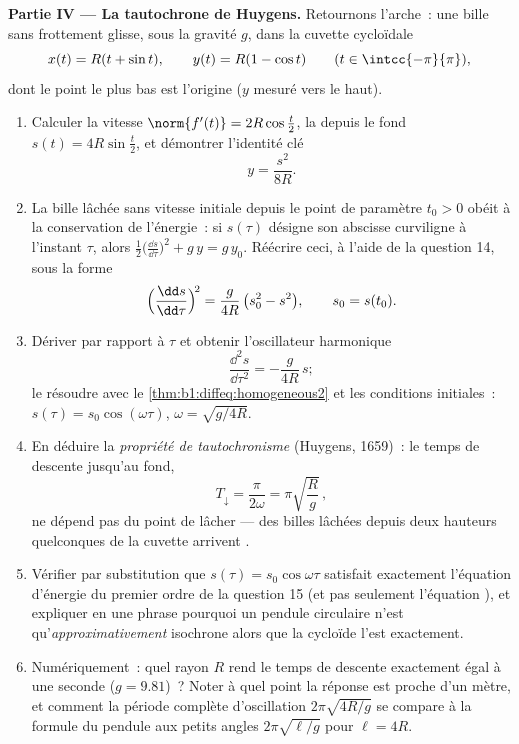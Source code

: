 \begin{problem}
\medskip
\noindent\textbf{Partie IV --- La tautochrone de Huygens.} Retournons
l'arche~: une bille sans frottement glisse, sous la gravité $g$, dans la
cuvette cycloïdale
\[
x(t) = R(t + \sin t), \qquad y(t) = R(1 - \cos t)
\qquad (t \in \intcc{-\pi}{\pi}),
\]
dont le point le plus bas est l'origine ($y$ mesuré vers le haut).
\begin{enumerate}[resume]
  \item Calculer la vitesse $\norm{f'(t)} = 2R\cos\frac t2$, la
         depuis le fond $s(t) = 4R\sin\frac t2$, et
        démontrer l'identité clé
        \[
        y = \frac{s^2}{8R} .
        \]
  \item La bille lâchée sans vitesse initiale depuis le point de paramètre
        $t_0 > 0$ obéit à la conservation de l'énergie~: si $s(\tau)$ désigne
        son abscisse curviligne à l'instant $\tau$, alors $\frac12\bigl(
        \frac{\dd s}{\dd\tau}\bigr)^2 + g\,y = g\,y_0$. Réécrire
        ceci, à l'aide de la question 14, sous la forme
        \[
        \Bigl(\frac{\dd s}{\dd\tau}\Bigr)^{\!2}
        = \frac{g}{4R}\,\bigl(s_0^2 - s^2\bigr),
        \qquad s_0 = s(t_0).
        \]
  \item Dériver par rapport à $\tau$ et obtenir l'oscillateur
        harmonique
        \[
        \frac{\dd^2 s}{\dd\tau^2} = -\frac{g}{4R}\,s ;
        \]
        le résoudre avec le \cref{thm:b1:diffeq:homogeneous2} et les
        conditions initiales~: $s(\tau) = s_0\cos(\omega\tau)$,
        $\omega = \sqrt{g/4R}$.
  \item En déduire la \emph{propriété de tautochronisme} (Huygens, 1659)~:
        le temps de descente jusqu'au fond,
        \[
        T_{\downarrow} = \frac{\pi}{2\omega}
        = \pi\sqrt{\frac Rg}\,,
        \]
        ne dépend pas du point de lâcher --- des billes lâchées
         depuis deux hauteurs quelconques de la cuvette arrivent
        .
  \item Vérifier par substitution que $s(\tau) =
        s_0\cos\omega\tau$ satisfait exactement l'équation d'énergie
        du premier ordre de la question 15 (et pas seulement l'équation
        ), et expliquer en une phrase pourquoi un
        pendule circulaire n'est qu'\emph{approximativement}
        isochrone alors que la cycloïde l'est exactement.
  \item Numériquement~: quel rayon $R$ rend le temps de descente
        exactement égal à une seconde ($g = 9.81$)~? Noter à quel point la
        réponse est proche d'un mètre, et comment la période complète
        d'oscillation $2\pi\sqrt{4R/g}$ se compare à la formule du
        pendule aux petits angles $2\pi\sqrt{\ell/g}$ pour $\ell = 4R$.
\end{enumerate}


\end{problem}
